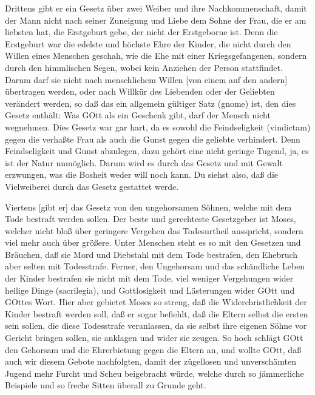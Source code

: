 Drittens gibt er ein Gesetz über zwei Weiber und ihre Nachkommenschaft, damit der Mann nicht nach seiner Zuneigung und Liebe dem Sohne der Frau, die er am liebsten hat, die Erstgeburt gebe, der nicht der Erstgeborne ist. Denn die Erstgeburt war die edelste und höchste Ehre der Kinder, die nicht durch den Willen eines Menschen geschah, wie die Ehe mit einer Kriegsgefangenen, sondern durch den himmlischen Segen, wobei kein Anziehen der Person stattfindet. Darum darf sie nicht nach menschlichem Willen [von einem auf den andern] übertragen werden, oder nach Willkür des Liebenden oder der Geliebten verändert werden, so daß das ein allgemein gültiger Satz (gnome) ist, den dies Gesetz enthält: Was GOtt als ein Geschenk gibt, darf der Mensch nicht wegnehmen. Dies Gesetz war gar hart, da es sowohl die Feindseligkeit (vindictam) gegen die verhaßte Frau als auch die Gunst gegen die geliebte verhindert. Denn Feindseligkeit und Gunst abzulegen, dazu gehört eine nicht geringe Tugend, ja, es ist der Natur unmöglich. Darum wird es durch das Gesetz und mit Gewalt erzwungen, was die Bosheit weder will noch kann. Du siehst also, daß die Vielweiberei durch das Gesetz gestattet werde.

Viertens [gibt er] das Gesetz von den ungehorsamen Söhnen, welche mit dem Tode bestraft werden sollen. Der beste und gerechteste Gesetzgeber ist Moses, welcher nicht bloß über geringere Vergehen das Todesurtheil ausspricht, sondern viel mehr auch über größere. Unter Menschen steht es so mit den Gesetzen und Bräuchen, daß sie Mord und Diebstahl mit dem Tode bestrafen, den Ehebruch aber selten mit Todesstrafe. Ferner, den Ungehorsam und das schändliche Leben der Kinder bestrafen sie nicht mit dem Tode, viel weniger Vergehungen wider heilige Dinge (sacrilegia), und Gottlosigkeit und Lästerungen wider GOtt und GOttes Wort. Hier aber gebietet Moses so streng, daß die Widerchristlichkeit der Kinder bestraft werden soll, daß er sogar befiehlt, daß die Eltern selbst die ersten sein sollen, die diese Todesstrafe veranlassen, da sie selbst ihre eigenen Söhne vor Gericht bringen sollen, sie anklagen und wider sie zeugen. So hoch schlägt GOtt den Gehorsam und die Ehrerbietung gegen die Eltern an, und wollte GOtt, daß auch wir diesem Gebote nachfolgten, damit der zügellosen und unverschämten Jugend mehr Furcht und Scheu beigebracht würde, welche durch so jämmerliche Beispiele und so freche Sitten überall zu Grunde geht.

